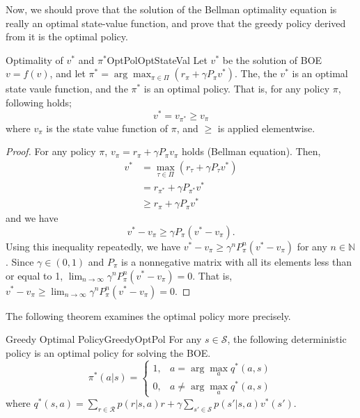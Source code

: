     Now, we should prove that the solution of the Bellman optimality equation is really an optimal state-value function,
    and prove that the greedy policy derived from it is the optimal policy.
    \begin{thm}{Optimality of $v^*$ and $\pi^*$}{OptPolOptStateVal}
        Let $v^*$ be the solution of BOE $v=f(v)$, and let $\pi^* = \arg\max_{\pi \in \Pi}(r_\pi + \gamma P_\pi v^*)$.
        The, the $v^*$ is an optimal state vaule function, and the $\pi^*$ is an optimal policy. That is, for any policy $\pi$,
        following holds;
        \begin{equation}
            v^* = v_{\pi^*} \geq v_\pi
        \end{equation}
        where $v_\pi$ is the state value function of $\pi$, and $\geq$ is applied elementwise.
    \end{thm}
    \begin{proof}
        For any policy $\pi$, $v_\pi = r_\pi + \gamma P_\pi v_\pi$ holds (Bellman equation). Then,
        \begin{align}
            v^* &= \max_{\tau \in \Pi}(r_\tau + \gamma P_\tau v^*) \\
                &= r_{\pi^*} + \gamma P_{\pi^*} v^* \\
                &\geq r_\pi + \gamma P_\pi v^*
        \end{align}
        and we have
        \begin{equation}
            v^*-v_\pi \geq \gamma P_\pi(v^*-v_\pi).
        \end{equation}
        Using this inequality repeatedly, we have $v^*-v_\pi \geq \gamma^n P_\pi^n (v^*-v_\pi)$ for any $n \in \mathbb{N}$.
        Since $\gamma \in (0,1)$ and $P_\pi$ is a nonnegative matrix with all its elements less than or equal to 1,
        $\lim_{n \to \infty} \gamma^n P_\pi^n (v^*-v_\pi)=0$. That is, $v^*-v_\pi \geq \lim_{n \to \infty} \gamma^n P_\pi^n (v^*-v_\pi)=0$.
    \end{proof}
    The following theorem examines the optimal policy more precisely.
    \begin{thm}{Greedy Optimal Policy}{GreedyOptPol}
        For any $s \in \mathcal{S}$, the following deterministic policy is an optimal policy for solving the BOE.
        \begin{equation}
            \pi^*(a|s) = 
            \begin{cases}
                1, &a = \arg\max_a q^*(a,s) \\
                0, &a \neq \arg\max_a q^*(a,s)
            \end{cases}
        \end{equation}
        where $q^*(s,a) = \sum_{r \in \mathcal{R}}p(r|s,a)r + \gamma \sum_{s' \in \mathcal{S}}p(s'|s,a)v^*(s')$.
    \end{thm}
